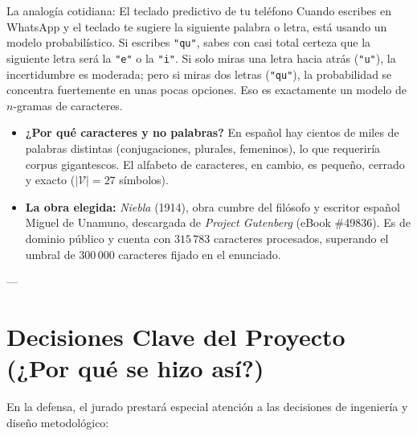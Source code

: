 \documentclass[11pt,letterpaper]{article}
\begin{document}
\begin{conceptbox}{La analogía cotidiana: El teclado predictivo de tu teléfono}
Cuando escribes en WhatsApp y el teclado te sugiere la siguiente palabra o letra, está usando un modelo probabilístico. Si escribes \texttt{"qu"}, sabes con casi total certeza que la siguiente letra será la \texttt{"e"} o la \texttt{"i"}. Si solo miras una letra hacia atrás (\texttt{"u"}), la incertidumbre es moderada; pero si miras dos letras (\texttt{"qu"}), la probabilidad se concentra fuertemente en unas pocas opciones. Eso es exactamente un modelo de $n$-gramas de caracteres.
\end{conceptbox}

\begin{itemize}[leftmargin=*, nosep]
    \item \textbf{¿Por qué caracteres y no palabras?} En español hay cientos de miles de palabras distintas (conjugaciones, plurales, femeninos), lo que requeriría corpus gigantescos. El alfabeto de caracteres, en cambio, es pequeño, cerrado y exacto ($|\mathcal{V}| = 27$ símbolos).
    \item \textbf{La obra elegida:} \textit{Niebla} (1914), obra cumbre del filósofo y escritor español Miguel de Unamuno, descargada de \textit{Project Gutenberg} (eBook \#49836). Es de dominio público y cuenta con $315\,783$ caracteres procesados, superando el umbral de $300\,000$ caracteres fijado en el enunciado.
\end{itemize}

---

\section{Decisiones Clave del Proyecto (¿Por qué se hizo así?)}

En la defensa, el jurado prestará especial atención a las decisiones de ingeniería y diseño metodológico:
\end{document}
